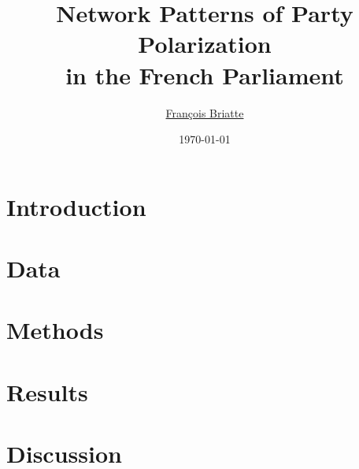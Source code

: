 \documentclass[12pt,a4paper]{article}\usepackage[]{graphicx}\usepackage[]{color}
\title{\large Network Patterns of Party Polarization \\ in the French Parliament}
\author{\href{mailto:f.briatte@ed.ac.uk}{François Briatte}}
\date{\today}
\begin{document}
	\maketitle
  


  \clearpage
  \section{Introduction}\label{sec:intro}%
  

  \section{Data}\label{sec:data}%
  

  \section{Methods}\label{sec:methods}%
  

  \section{Results}\label{sec:results}%
  

  \section{Discussion}\label{sec:discussion}%
  

\theendnotes
\clearpage

\singlespacing

\clearpage
\doublespacing

\end{document}
